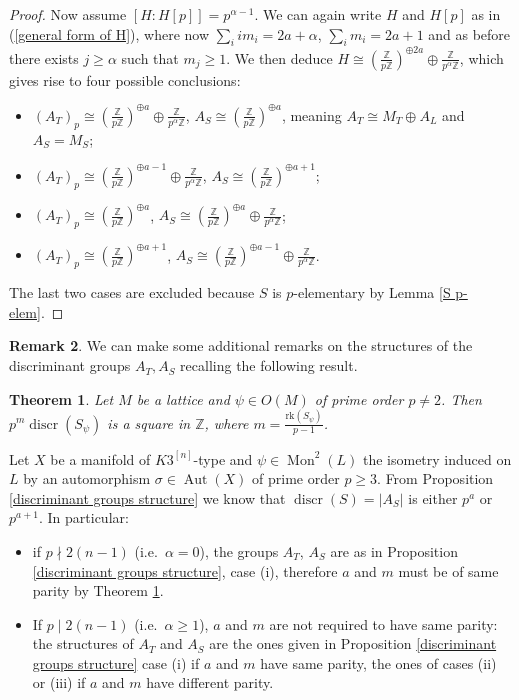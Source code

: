 \documentclass{amsart}
\newtheorem{theorem}{Theorem}[section]
\theoremstyle{definition}
\newtheorem{rem}[theorem]{Remark}
\newcommand{\IZ}{\mathbb{Z}}
\newcommand{\rk}{\mathrm{rk}}
\newcommand{\hskn}{K3^{\left[n\right]}}
\DeclareMathOperator{\discr}{discr}
\DeclareMathOperator{\Mo}{Mon}
\DeclareMathOperator{\aut}{Aut}
\begin{document}
\begin{proof}
Now assume $\left[ H : H[p]\right] = p^{\alpha-1}$. We can again write $H$ and $H[p]$ as in (\ref{general form of H}), where now $\sum_{i}im_i = 2a + \alpha$, $\sum_{i} m_i = 2a+1$ and as before there exists $j \geq \alpha$ such that $m_j \geq 1$. We then deduce $H \cong \left( \frac{\IZ}{p \IZ}\right)^{\oplus 2a} \oplus \frac{\IZ}{p^\alpha \IZ}$, which gives rise to four possible conclusions:
\begin{itemize}
\item $\left(A_T\right)_p \cong \left( \frac{\IZ}{p \IZ}\right)^{\oplus a} \oplus \frac{\IZ}{p^\alpha \IZ}$, $A_S \cong \left( \frac{\IZ}{p \IZ}\right)^{\oplus a}$, meaning $A_T \cong M_T \oplus A_L$ and $A_S = M_S$;
\item $\left(A_T\right)_p \cong \left( \frac{\IZ}{p \IZ}\right)^{\oplus a-1} \oplus \frac{\IZ}{p^\alpha \IZ}$, $A_S \cong \left( \frac{\IZ}{p \IZ}\right)^{\oplus a+1}$;
\item $\left(A_T\right)_p \cong \left( \frac{\IZ}{p \IZ}\right)^{\oplus a}$, $A_S \cong \left( \frac{\IZ}{p \IZ}\right)^{\oplus a} \oplus \frac{\IZ}{p^\alpha \IZ}$;
\item $\left(A_T\right)_p \cong \left( \frac{\IZ}{p \IZ}\right)^{\oplus a+1}$, $A_S \cong \left( \frac{\IZ}{p \IZ}\right)^{\oplus a-1} \oplus \frac{\IZ}{p^\alpha \IZ}$.
\end{itemize}

The last two cases are excluded because $S$ is $p$-elementary by Lemma \ref{S p-elem}.
\end{proof}

\begin{rem}\label{parity}
We can make some additional remarks on the structures of the discriminant groups $A_T, A_S$ recalling the following result.

\begin{theorem} \label{thm: tari} \cite[Th\'eor\`eme 2.23]{tari}
Let $M$ be a lattice and $\psi \in O(M)$ of prime order $p \neq 2$. Then $p^m \discr (S_\psi)$ is a square in $\IZ$, where $m = \frac{\rk(S_\psi)}{p-1}$.
\end{theorem}

Let $X$ be a manifold of $\hskn$-type and $\psi \in \Mo^2(L)$ the isometry induced on $L$ by an automorphism $\sigma \in \aut(X)$ of prime order $p \geq 3$. From Proposition \ref{discriminant groups structure} we know that $\discr(S) = \lvert A_S\rvert$ is either $p^a$ or $p^{a+1}$. In particular:
\begin{itemize}
\item if $p \nmid 2(n-1)$ (i.e.\ $\alpha = 0$), the groups $A_T$, $A_S$ are as in Proposition \ref{discriminant groups structure}, case (i), therefore $a$ and $m$ must be of same parity by Theorem \ref{thm: tari}. 
\item If $p \mid 2(n-1)$ (i.e.\ $\alpha \geq 1$), $a$ and $m$ are not required to have same parity: the structures of $A_T$ and $A_S$ are the ones given in Proposition \ref{discriminant groups structure} case (i) if $a$ and $m$ have same parity, the ones of cases (ii) or (iii) if $a$ and $m$ have different parity. 
\end{itemize} 
\end{rem}
\end{document}
